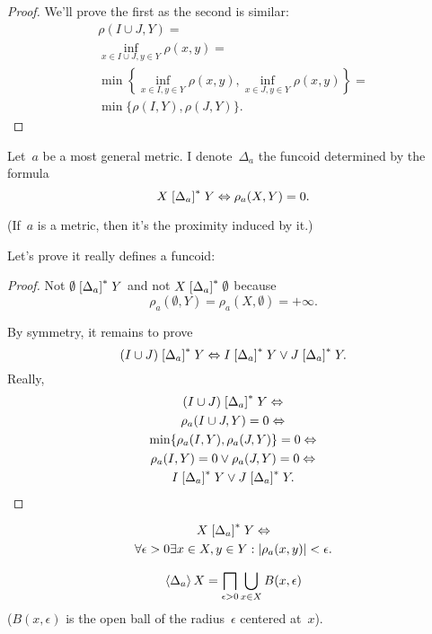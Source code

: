 \begin{proof}
We'll prove the first as the second is similar:
\begin{multline*}
\rho(I\cup J,Y) = \\
\inf_{x\in I\cup J,y\in Y}\rho(x,y) = \\
\min\left\{\inf_{x\in I,y\in Y}\rho(x,y), \inf_{x\in J,y\in Y}\rho(x,y)\right\} = \\
\min\{\rho(I,Y), \rho(J,Y)\}.
\end{multline*}
\end{proof}

Let~$a$ be a most general metric. I denote~$\Delta_a$ the funcoid determined by the formula
\[
X\mathrel{\left[\Delta_a\right]^{\ast}}Y \Leftrightarrow \rho_a(X,Y)=0.
\]

(If~$a$ is a metric, then it's the proximity induced by it.)

Let's prove it really defines a funcoid:

\begin{proof}
Not $\emptyset\mathrel{\left[\Delta_a\right]^{\ast}}Y$ and not $X\mathrel{\left[\Delta_a\right]^{\ast}}\emptyset$ because \[ \rho_{a}(\emptyset,Y)=\rho_{a}(X,\emptyset)=+\infty. \]

By symmetry, it remains to prove
\[ (I\cup J)\mathrel{\left[\Delta_a\right]^{\ast}}Y \Leftrightarrow
I\mathrel{\left[\Delta_a\right]^{\ast}}Y \lor J\mathrel{\left[\Delta_a\right]^{\ast}}Y. \]
Really,
\begin{multline*}
(I\cup J)\mathrel{\left[\Delta_a\right]^{\ast}}Y \Leftrightarrow \\
\rho_a(I\cup J,Y)=0 \Leftrightarrow \\
\min\{\rho_a(I,Y),\rho_a(J,Y)\}=0 \Leftrightarrow \\
\rho_a(I,Y)=0\lor\rho_a(J,Y)=0 \Leftrightarrow \\
I\mathrel{\left[\Delta_a\right]^{\ast}}Y \lor J\mathrel{\left[\Delta_a\right]^{\ast}}Y.
\end{multline*}
\end{proof}

\begin{obvious}
\begin{multline*}
X\mathrel{\left[\Delta_a\right]^{\ast}}Y \Leftrightarrow \\
\forall\epsilon>0\exists x\in X,y\in Y:
\lvert\rho_a(x,y)\rvert<\epsilon.
\end{multline*}
\end{obvious}

\begin{thm}
\[ \left\langle \Delta_a\right\rangle X = \bigsqcap_{\epsilon>0}\bigcup_{x\in X}B(x,\epsilon) \]
($B(x,\epsilon)$ is the open ball of the radius~$\epsilon$ centered at~$x$).
\end{thm}

